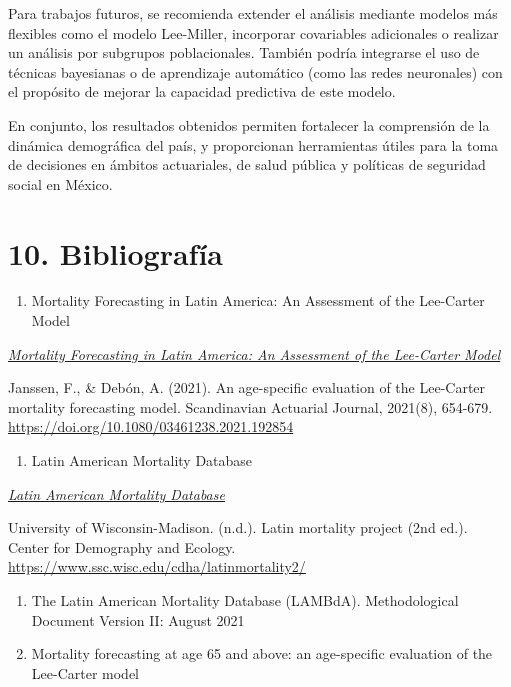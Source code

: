 \documentclass[
]{article}
\providecommand{\tightlist}{%
  \setlength{\itemsep}{0pt}\setlength{\parskip}{0pt}}
\begin{document}
Para trabajos futuros, se recomienda extender el análisis mediante
modelos más flexibles como el modelo Lee-Miller, incorporar covariables
adicionales o realizar un análisis por subgrupos poblacionales. También
podría integrarse el uso de técnicas bayesianas o de aprendizaje
automático (como las redes neuronales) con el propósito de mejorar la
capacidad predictiva de este modelo.

En conjunto, los resultados obtenidos permiten fortalecer la comprensión
de la dinámica demográfica del país, y proporcionan herramientas útiles
para la toma de decisiones en ámbitos actuariales, de salud pública y
políticas de seguridad social en México.

\clearpage

\hypertarget{bibliografuxeda}{%
\section{10. Bibliografía}\label{bibliografuxeda}}

\begin{enumerate}
\def\labelenumi{\arabic{enumi}.}
\tightlist
\item
  Mortality Forecasting in Latin America: An Assessment of the
  Lee-Carter Model
\end{enumerate}

\href{https://www.tandfonline.com/doi/epdf/10.1080/03461238.2021.1928542?needAccess=true}{\emph{Mortality
Forecasting in Latin America: An Assessment of the Lee-Carter Model}}

Janssen, F., \& Debón, A. (2021). An age-specific evaluation of the
Lee-Carter mortality forecasting model. Scandinavian Actuarial Journal,
2021(8), 654-679. \url{https://doi.org/10.1080/03461238.2021.192854}

\begin{enumerate}
\def\labelenumi{\arabic{enumi}.}
\setcounter{enumi}{1}
\tightlist
\item
  Latin American Mortality Database
\end{enumerate}

\href{https://www.ssc.wisc.edu/cdha/latinmortality2/?page_id=28}{\emph{Latin
American Mortality Database}}

University of Wisconsin-Madison. (n.d.). Latin mortality project (2nd
ed.). Center for Demography and Ecology.
\url{https://www.ssc.wisc.edu/cdha/latinmortality2/}

\begin{enumerate}
\def\labelenumi{\arabic{enumi}.}
\setcounter{enumi}{2}
\item
  The Latin American Mortality Database (LAMBdA). Methodological
  Document Version II: August 2021
\item
  Mortality forecasting at age 65 and above: an age-specific evaluation
  of the Lee-Carter model
\end{enumerate}
\end{document}
